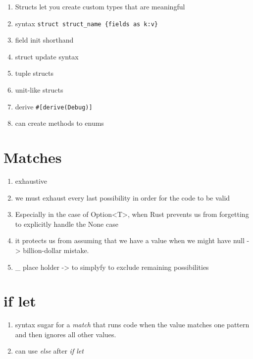 \documentclass[11pt]{article}
\begin{document}
\begin{enumerate}
\item Structs let you create custom types that are meaningful

\item syntax     \verb~struct struct_name {fields as k:v}~

\item field init shorthand

\item struct update syntax

\item tuple structs

\item unit-like structs

\item derive \verb~#[derive(Debug)]~

\item can create methods to enums
\end{enumerate}


\section{Matches}
\label{sec-9}

\begin{enumerate}
\item exhaustive

\item we must exhaust every last possibility in order for the code to be valid

\item Especially in the case of Option<T>, when Rust prevents us from forgetting to explicitly handle the None case

\item it protects us from assuming that we have a value when we might have null -> billion-dollar mistake.

\item \_ place holder -> to simplyfy to exclude remaining possibilities
\end{enumerate}


\section{if let}
\label{sec-10}

\begin{enumerate}
\item syntax sugar for a \emph{match} that runs code when the value matches one pattern and then ignores all other values.

\item can use \emph{else} after \emph{if let}
\end{enumerate}
\end{document}
